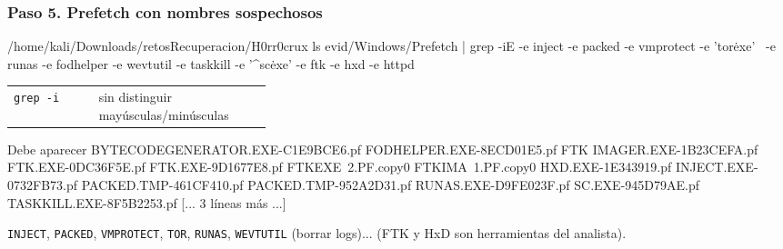 \documentclass[11pt,a4paper]{article}
\begin{document}
\subsubsection*{Paso 5. Prefetch con nombres sospechosos}
\begin{comando}{/home/kali/Downloads/retosRecuperacion/H0rr0crux}
ls evid/Windows/Prefetch | grep -iE -e inject -e packed -e vmprotect -e 'tor\.exe' \
  -e runas -e fodhelper -e wevtutil -e taskkill -e '^sc\.exe' -e ftk -e hxd -e httpd
\end{comando}
\begin{tcolorbox}[enhanced, breakable, colback=gray!3, colframe=gray!35, boxrule=0.3pt, arc=1pt, left=4pt, right=4pt, top=2pt, bottom=2pt, fonttitle=\sffamily\scriptsize\bfseries, coltitle=black!70, colbacktitle=gray!10, title={Qué hace cada parte}, attach title to upper, before skip=2pt, after skip=4pt, fontupper=\small]
\par{\renewcommand{\arraystretch}{1.12}\begin{tabularx}{\linewidth}{@{}>{\raggedright\arraybackslash}p{0.33\linewidth}>{\raggedright\arraybackslash}X@{}}
\texttt{grep -i} & sin distinguir mayúsculas/minúsculas \\
\end{tabularx}}
\end{tcolorbox}
\begin{salida}{Debe aparecer}
BYTECODEGENERATOR.EXE-C1E9BCE6.pf
FODHELPER.EXE-8ECD01E5.pf
FTK IMAGER.EXE-1B23CEFA.pf
FTK.EXE-0DC36F5E.pf
FTK.EXE-9D1677E8.pf
FTKEXE~2.PF.copy0
FTKIMA~1.PF.copy0
HXD.EXE-1E343919.pf
INJECT.EXE-0732FB73.pf
PACKED.TMP-461CF410.pf
PACKED.TMP-952A2D31.pf
RUNAS.EXE-D9FE023F.pf
SC.EXE-945D79AE.pf
TASKKILL.EXE-8F5B2253.pf
[... 3 líneas más ...]
\end{salida}
\begin{nota}\texttt{INJECT}, \texttt{PACKED}, \texttt{VMPROTECT}, \texttt{TOR}, \texttt{RUNAS}, \texttt{WEVTUTIL} (borrar logs)... (FTK y HxD son herramientas del analista).\end{nota}
\end{document}
